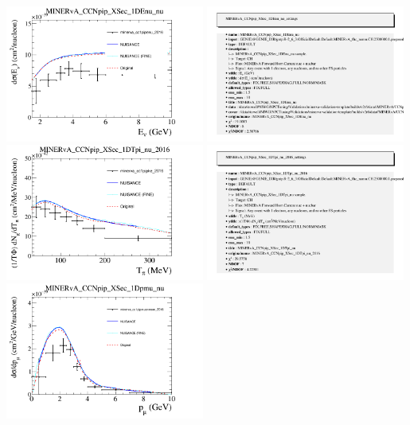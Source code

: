 \documentclass{article}
\begin{document}
\centering
\includegraphics[width=0.49\textwidth]{figures/minerva_cc1pipenu_2016_comp.png}
\includegraphics[width=0.49\textwidth]{figures/minerva_cc1pipenu_2016_info.png}
\centering
\includegraphics[width=0.49\textwidth]{figures/minerva_cc1pipke_2016_comp.png}
\includegraphics[width=0.49\textwidth]{figures/minerva_cc1pipke_2016_info.png}
\centering
\includegraphics[width=0.49\textwidth]{figures/minerva_cc1pipmuonmom_2016_comp.png}
\end{document}
